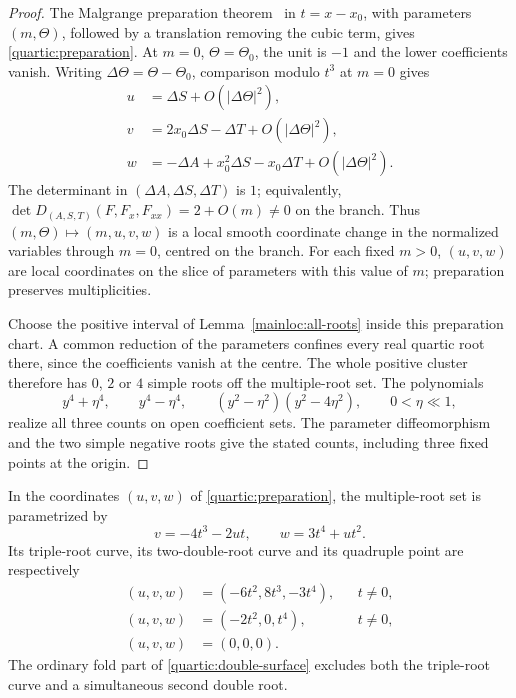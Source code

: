 \begin{proof}
The Malgrange preparation theorem~\cite[Chapter~IV, Section~2, Theorem~2.1 and Note~(1), p.~95]{golubitsky1973} in $t=x-x_0$,
with parameters $(m,\Theta)$, followed by a translation removing the cubic term,
gives \eqref{quartic:preparation}. At $m=0$, $\Theta=\Theta_0$, the unit
is $-1$ and the lower coefficients vanish. Writing $\Delta\Theta=\Theta-\Theta_0$,
comparison modulo $t^3$ at $m=0$ gives
\[
 \begin{aligned}
 u&=\Delta S+O(|\Delta\Theta|^2),\\
 v&=2x_0\Delta S-\Delta T+O(|\Delta\Theta|^2),\\
 w&=-\Delta A+x_0^2\Delta S-x_0\Delta T
                                    +O(|\Delta\Theta|^2).
 \end{aligned}
\]
The determinant in $(\Delta A,\Delta S,\Delta T)$ is $1$; equivalently,
$\det D_{(A,S,T)}(F,F_x,F_{xx})=2+O(m)\ne0$ on the branch.
Thus $(m,\Theta)\mapsto(m,u,v,w)$ is a local smooth coordinate change in the
normalized variables through $m=0$, centred on the branch. For each fixed
$m>0$, $(u,v,w)$ are local coordinates on the slice of parameters with this
value of $m$; preparation preserves multiplicities.

Choose the positive interval of Lemma~\ref{mainloc:all-roots} inside this
preparation chart. A common reduction of the parameters confines every real
quartic root there, since the coefficients vanish at the centre. The whole positive
cluster therefore has $0$, $2$ or $4$ simple roots off the multiple-root set.
The polynomials
\[
 y^4+\eta^4,\qquad y^4-\eta^4,\qquad
 (y^2-\eta^2)(y^2-4\eta^2),\qquad 0<\eta\ll1,
\]
realize all three counts on open coefficient sets. The parameter
diffeomorphism and the two simple negative roots give the stated counts,
including three fixed points at the origin.
\end{proof}

\begin{proposition}\label{quartic:strata}
In the coordinates $(u,v,w)$ of \eqref{quartic:preparation},
the multiple-root set is parametrized by
\begin{equation}\label{quartic:double-surface}
 v=-4t^3-2ut,\qquad w=3t^4+ut^2.
\end{equation}
Its triple-root curve, its two-double-root curve and its quadruple
point are respectively
\[
 \begin{aligned}
 (u,v,w)&=(-6t^2,8t^3,-3t^4),&&t\ne0,\\
 (u,v,w)&=(-2t^2,0,t^4),&&t\ne0,\\
 (u,v,w)&=(0,0,0).
 \end{aligned}
\]
The ordinary fold part of \eqref{quartic:double-surface} excludes
both the triple-root curve and a simultaneous second double root.
\end{proposition}

